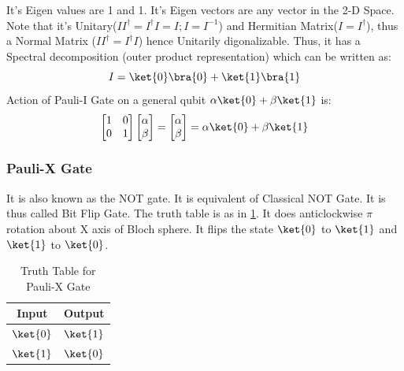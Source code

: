 \documentclass[12pt, oneside]{book}
\theoremstyle{definition}
\theoremstyle{definition}
\theoremstyle{remark}
\begin{document}
It's Eigen values are 1 and 1. It's Eigen vectors are any vector in the 2-D Space.
Note that it's Unitary($II^{\dagger}=I^{\dagger}I=I;I=I^{-1}$) and Hermitian Matrix($I=I^{\dagger}$), thus a Normal Matrix ($II^{\dagger}=I^{\dagger}I$) hence Unitarily digonalizable.
Thus, it has a Spectral decomposition (outer product representation) which can be written as:
\[
    I=\ket{0}\bra{0}+\ket{1}\bra{1}
\]
Action of Pauli-I Gate on a general qubit $\alpha\ket{0}+\beta\ket{1}$ is:
\[
    \begin{bmatrix}
        1 & 0 \\
        0 & 1
    \end{bmatrix}\begin{bmatrix}
        \alpha \\
        \beta
    \end{bmatrix}=\begin{bmatrix}
        \alpha \\
        \beta
    \end{bmatrix}= \alpha\ket{0}+\beta\ket{1}
\]

\subsubsection{Pauli-X Gate}
It is also known as the NOT gate. It is equivalent of Classical NOT Gate.
It is thus called Bit Flip Gate. The truth table is as in \ref{tab:pauli-x}. It does anticlockwise $\pi$ rotation about X 
axis of Bloch sphere. It flips the state $\ket{0}$ to $\ket{1}$ and $\ket{1}$ to $\ket{0}$.
\begin{table}[H]
    \centering
    \begin{tabular}{|c|c|}
        \hline
        Input & Output\\
        \hline
        $\ket{0}$ & $\ket{1}$\\
        $\ket{1}$ & $\ket{0}$\\
        \hline
    \end{tabular}
    \caption{Truth Table for Pauli-X Gate}
    \label{tab:pauli-x}
\end{table}
\end{document}
